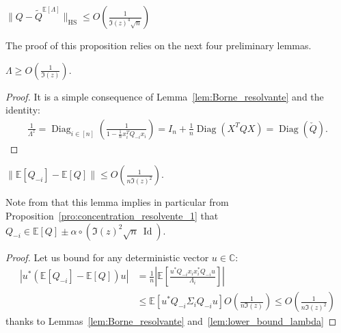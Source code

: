 \documentclass[ECP, preprint]{ejpecp} %
\DeclareMathOperator{\diag}{Diag}
\DeclareMathOperator{\id}{Id}
\DeclareMathOperator{\hs}{HS}
\begin{document}
\begin{proposition}\label{pro:first_first_det_eq}
    $\|Q - \tilde Q^{\mathbb E[\Lambda]}\|_{\hs}\leq O \left( \frac{1}{\Im(z)^4\sqrt{n}} \right)$
\end{proposition}
The proof of this proposition relies on the next four preliminary lemmas.
\begin{lemma}\label{lem:lower_bound_lambda}
     $\Lambda \geq O \left( \frac{1}{\Im(z)} \right)$.
 \end{lemma} 
 \begin{proof}
    It is a simple consequence of Lemma~\ref{lem:Borne_resolvante} and the identity:
     \begin{align}\label{eq:link_lambda_cQ}
   \frac{1}{\Lambda^z}
   =\diag_{i\in [n]}\left(\frac{1}{1- \frac1{n}x_i^TQ_{-i}x_i}\right)
  = I_n + \frac{1}{n}\diag(X^TQX) = \diag(\check Q).
\end{align}
 \end{proof}
\begin{lemma}\label{lem:concentration_Q_m_i_autour_Q}
    $\|\mathbb E[Q_{-i}]- \mathbb E[Q] \| \leq O\left( \frac{1}{n\Im(z)^2} \right)$.
\end{lemma}
Note from \cite{} that this lemma implies in particular from Proposition~\ref{pro:concentration_resolvente_1}  that $Q_{-i}\in \mathbb E[Q] \pm \alpha \circ \left( \Im(z)^2\sqrt n \ \id \right)$.
\begin{proof}
    Let us bound for any deterministic vector $u\in \mathbb C$:
    \begin{align*}
        |u^*(\mathbb E[Q_{-i}] - \mathbb E[Q])u| 
        &= \frac{1}{n} \left\vert \mathbb E \left[ \frac{u^*Q_{-i}x_ix_i^* Q_{-i}u}{\Lambda_i} \right] \right\vert\\
        &\leq  \mathbb E[u^*Q_{-i}\Sigma_iQ_{-i}u] O \left( \frac{1}{n\Im(z)} \right)
        \leq O\left( \frac{1}{n\Im(z)^2} \right)
    \end{align*}
    thanks to Lemmas~\ref{lem:Borne_resolvante} and~\ref{lem:lower_bound_lambda}
\end{proof}
\end{document}
